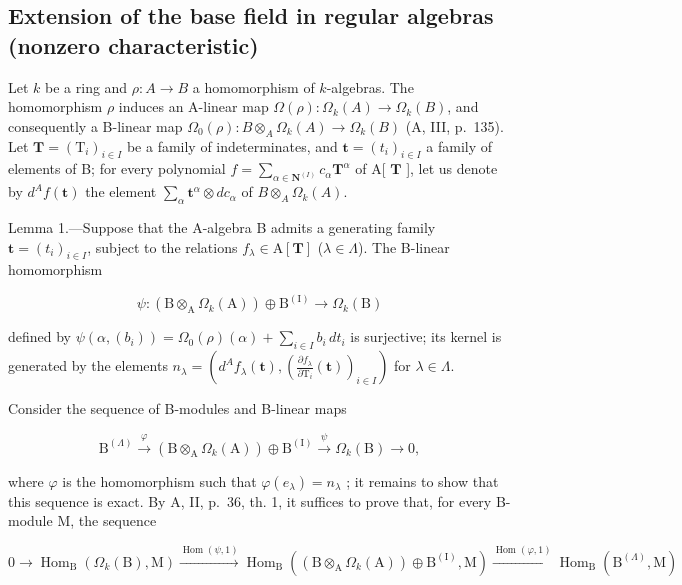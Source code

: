 \subsection{Extension of the base field in regular algebras (nonzero characteristic)}

Let \(k\) be a ring and \(\rho: A \to B\) a homomorphism of \(k\)-algebras. The homomorphism \(\rho\) induces an A-linear map \(\Omega(\rho): \Omega_k(A) \to \Omega_k(B)\), and consequently a B-linear map \(\Omega_0(\rho): B \otimes_A \Omega_k(A) \to \Omega_k(B)\) (A, III, p.~135). Let \(\mathbf{T} = (\mathrm{T}_i)_{i \in I}\) be a family of indeterminates, and \(\mathbf{t} = (t_i)_{i \in I}\) a family of elements of B; for every polynomial \(f = \sum_{\alpha \in \mathbf{N}^{(I)}} c_\alpha \mathbf{T}^\alpha\) of A{[} \(\mathbf{T}\) {]}, let us denote by \(d^{A} f(\mathbf{t})\) the element \(\sum_{\alpha} \mathbf{t}^\alpha \otimes dc_\alpha\) of \(B \otimes_A \Omega_k(A)\).

Lemma 1.—Suppose that the A-algebra B admits a generating family \(\mathbf{t} = (t_i)_{i\in I}\), subject to the relations \(f_\lambda \in \mathrm{A}[\mathbf{T}]\) (\(\lambda \in \Lambda\)). The B-linear homomorphism

\[
\psi : (\mathrm{B} \otimes_ {\mathrm{A}} \Omega_ {k} (\mathrm{A})) \oplus \mathrm{B} ^ {(\mathrm{I})} \longrightarrow \Omega_ {k} (\mathrm{B})
\]

defined by \(\psi(\alpha,(b_i)) = \Omega_0(\rho)(\alpha) + \sum_{i\in I}b_i\,dt_i\) is surjective; its kernel is generated by the elements \(n_{\lambda} = \left(d^{A}f_{\lambda}(\mathbf{t}),\left(\frac{\partial f_{\lambda}}{\partial\mathrm{T}_{i}}(\mathbf{t})\right)_{i\in I}\right)\) for \(\lambda \in \Lambda\).

Consider the sequence of B-modules and B-linear maps

\[
\mathrm{B} ^ {(\Lambda)} \xrightarrow {\varphi} (\mathrm{B} \otimes_ {\mathrm{A}} \Omega_ {k} (\mathrm{A})) \oplus \mathrm{B} ^ {(\mathrm{I})} \xrightarrow {\psi} \Omega_ {k} (\mathrm{B}) \longrightarrow 0,
\]

where \(\varphi\) is the homomorphism such that \(\varphi(e_{\lambda}) = n_{\lambda}\) ; it remains to show that this sequence is exact. By A, II, p.~36, th. 1, it suffices to prove that, for every B-module M, the sequence

\[
0 \to \operatorname{Hom} _ {\mathrm{B}} (\Omega _{k}(\mathrm{B}), \mathrm{M}) \xrightarrow {\operatorname{Hom}(\psi,1)} \operatorname{Hom} _{\mathrm{B}} ((\mathrm{B} \otimes_{\mathrm{A}} \Omega _{k}(\mathrm{A})) \oplus \mathrm{B}^{(\mathrm{I})}, \mathrm{M}) \xrightarrow {\operatorname{Hom}(\varphi,1)} \operatorname{Hom}_{\mathrm{B}}(\mathrm{B}^{(\Lambda)}, \mathrm{M})
\]

